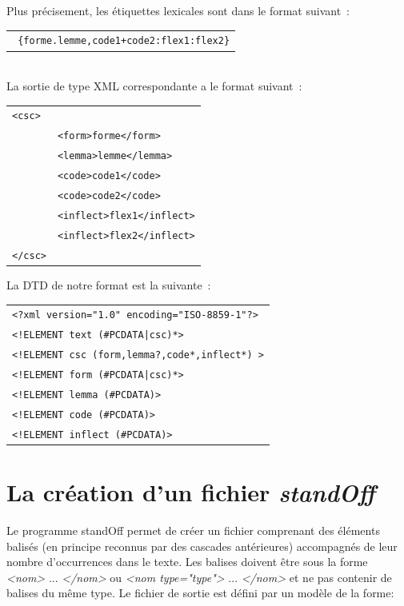 Plus précisement, les étiquettes lexicales sont dans le format suivant~:\\
\begin{tabular}{c}
\texttt{
\{forme.lemme,code1+code2:flex1:flex2\}}
\end{tabular}\\
La sortie de type XML correspondante a le format suivant~:\\
\begin{tabular}{ll}
\texttt{<csc>}&\\
	&\texttt{<form>forme</form>}\\
	&\texttt{<lemma>lemme</lemma>}\\
	&\texttt{<code>code1</code>}\\
	&\texttt{<code>code2</code>}\\
	&\texttt{<inflect>flex1</inflect>}\\
	&\texttt{<inflect>flex2</inflect>}\\
\texttt{</csc>}&\\
\end{tabular}

La DTD de notre format est la suivante~:

\begin{tabular}{l}
\texttt{<?xml version="1.0" encoding="ISO-8859-1"?>}\\
\texttt{<!ELEMENT text (\#PCDATA|csc)*>}\\
\texttt{<!ELEMENT csc (form,lemma?,code*,inflect*) >}\\
\texttt{<!ELEMENT form (\#PCDATA|csc)*>}\\
\texttt{<!ELEMENT lemma (\#PCDATA)>}\\
\texttt{<!ELEMENT code (\#PCDATA)>}\\
\texttt{<!ELEMENT inflect (\#PCDATA)>}\\
\end{tabular}


\section{La création d'un fichier \textit{standOff}}

Le programme standOff permet de créer un fichier comprenant des éléments balisés (en principe reconnus par des cascades antérieures) accompagnés de leur nombre d'occurrences dans le texte. Les balises doivent être sous la forme \emph{<nom>} ... \emph{</nom>} ou \emph{<nom type="type">} ... \emph{</nom>} et ne pas contenir de balises du même type. Le fichier de sortie est défini par un modèle de la forme:

